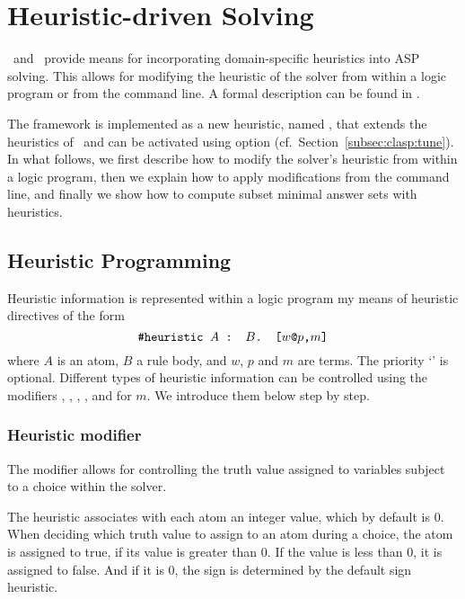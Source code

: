 
\section{Heuristic-driven Solving}
\label{sec:heuristic}
\clasp\ and \clingo\ provide means for incorporating domain-specific heuristics into ASP solving.
This allows for modifying the heuristic of the solver from within a logic program or from the command line.
A formal description can be found in \cite{gekaotroscwa13a}.

The framework is implemented as a new heuristic, named ,
that extends the  heuristics of \clasp\ 
and can be activated using option 
(cf.\ Section~\ref{subsec:clasp:tune}).
In what follows,
we first describe how to modify the solver's heuristic from within a logic program, 
then we explain how to apply modifications from the command line, 
and finally we show how to compute subset minimal answer sets with heuristics.

\subsection{Heuristic Programming}
Heuristic information is represented within a logic program my means of heuristic directives of the form
\[\texttt{\#heuristic }A\texttt{ : }B\texttt{. [}w\texttt{@}p\texttt{,}m\texttt{]}\]
where $A$ is an atom, $B$ a rule body, and $w$, $p$ and $m$ are terms.
%
The priority `' is optional.
%
Different types of heuristic information can be controlled using the modifiers 
\code{sign}, \code{level}, \code{true}, \code{false}, \code{init} and  for $m$.
We introduce them below step by step.

\subsubsection{Heuristic modifier }
The modifier \code{sign} allows for controlling the truth value assigned to variables subject to a choice within the solver.

The  heuristic associates with each atom an integer  value, which by default is $0$.
When deciding which truth value to assign to an atom during a choice, the atom is assigned to true, if its  value is greater than $0$. 
If the \code{sign} value is less than 0, it is assigned to false.
And if it is $0$, the sign is determined by the default sign heuristic.

